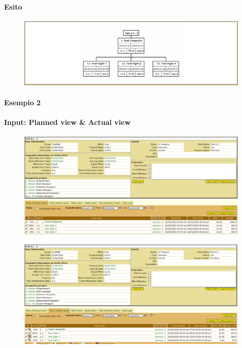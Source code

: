 \paragraph{Esito}
\begin{figure}[h!]
\centering
\includegraphics[width=\textwidth]{tests/TEST_WBS/4.1/4.1_2/Esempio_1/output.png}
\end{figure}
\newpage

\paragraph{Esempio 2}
\paragraph{Input: Planned view & Actual view}
\begin{figure}[h!]
\centering
\includegraphics[width=\textwidth]{tests/TEST_WBS/4.1/4.1_2/Esempio_2/input.png}
\end{figure}
\begin{figure}[h!]
\centering
\includegraphics[width=\textwidth]{tests/TEST_WBS/4.1/4.1_2/Esempio_2/input_actual.png}
\end{figure}
\newpage

